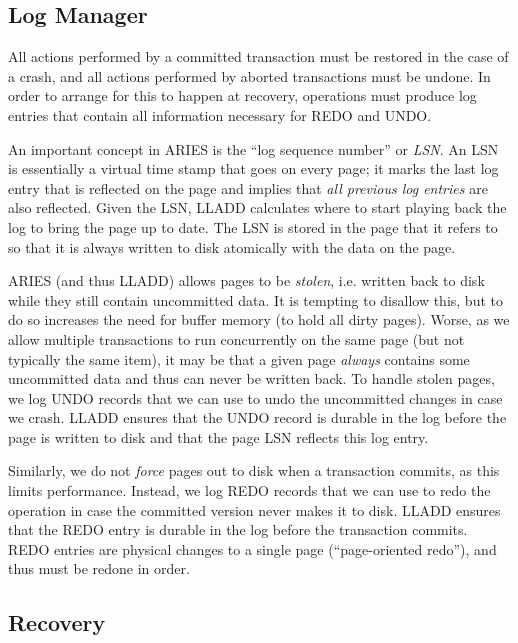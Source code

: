 \documentclass[10pt,letterpaper,twocolumn,english]{article}
\newcommand{\yad}{LLADD\xspace}
\begin{document}
\subsection{Log Manager}
\label{log-manager}

All actions performed by a committed transaction must be
restored in the case of a crash, and all actions performed by aborted
transactions must be undone. In order to arrange for this
to happen at recovery, operations must produce log entries that contain
all information necessary for REDO and UNDO.

An important concept in ARIES is the ``log sequence number'' or {\em
LSN}.  An LSN is essentially a virtual time stamp that goes on every
page; it marks the last log entry that is reflected on the page and
implies that {\em all previous log entries} are also reflected.  Given the
LSN, \yad calculates where to start playing back the log to bring the
page up to date.  The LSN is stored in the page that it refers to so
that it is always written to disk atomically with the data on the
page.

ARIES (and thus \yad) allows pages to be {\em stolen}, i.e. written
back to disk while they still contain uncommitted data.  It is
tempting to disallow this, but to do so increases the need for buffer
memory (to hold all dirty pages). Worse, as we allow multiple
transactions to run concurrently on the same page (but not typically
the same item), it may be that a given page {\em always} contains some
uncommitted data and thus can never be written back.  To handle stolen
pages, we log UNDO records that we can use to undo the uncommitted
changes in case we crash.  \yad ensures that the UNDO record is
durable in the log before the page is written to disk and that the
page LSN reflects this log entry.

Similarly, we do not {\em force} pages out to disk when a transaction
commits, as this limits performance.  Instead, we log REDO records
that we can use to redo the operation in case the committed version never
makes it to disk.  \yad ensures that the REDO entry is durable in the
log before the transaction commits.  REDO entries are physical changes
to a single page (``page-oriented redo''), and thus must be redone in
order. 





\subsection{Recovery}
\label{recovery}
\end{document}
